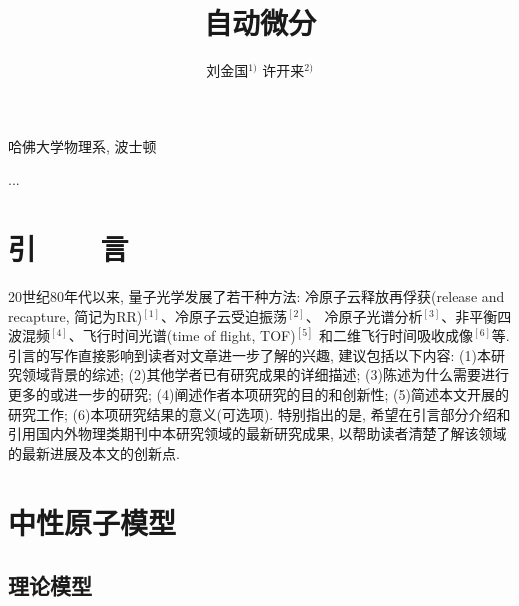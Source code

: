 \documentclass[A4,twoside,fontset=ubuntu,UTF8]{ctexart}
\begin{document}
\apsname

\title{自动微分 \fivestar}%

\author{刘金国$^{1)}$ \quad 许开来$^{2)}$}

\address{1)}{哈佛大学物理系, 波士顿 }
\address{2)}{...}









\section{引~~~~言}


20世纪80年代以来, 量子光学发展了若干种方法: 冷原子云释放再俘获(release and
recapture, 简记为RR)$^{[1]}$、冷原子云受迫振荡$^{[2]}$、 冷原子光谱分析$^{[3]}$、非平衡四波混频$^{[4]}$、飞行时间光谱(time
of flight, TOF)$^{[5]}$ 和二维飞行时间吸收成像$^{[6]}$等. 引言的写作直接影响到读者对文章进一步了解的兴趣, 建议包括以下内容:
(1)本研究领域背景的综述; (2)其他学者已有研究成果的详细描述;
(3)陈述为什么需要进行更多的或进一步的研究;
(4)阐述作者本项研究的目的和创新性; (5)简述本文开展的研究工作;
(6)本项研究结果的意义(可选项). 特别指出的是, 希望在引言部分介绍和引用国内外物理类期刊中本研究领域的最新研究成果, 以帮助读者清楚了解该领域的最新进展及本文的创新点.

\section{中性原子模型}

\subsection{理论模型}
\end{document}
